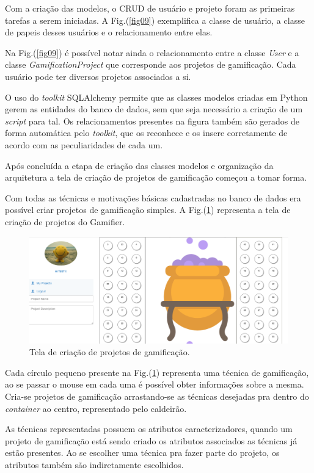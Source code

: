Com a criação das modelos, o CRUD de usuário e projeto foram as primeiras tarefas a serem iniciadas. A Fig.(\ref{fig09}) exemplifica a classe de usuário, a classe de papeis desses usuários e o relacionamento entre elas. 

Na Fig.(\ref{fig09}) é possível notar ainda o relacionamento entre a classe \textit{User} e a classe \textit{GamificationProject} que corresponde aos projetos de gamificação. Cada usuário pode ter diversos projetos associados a si.


O uso do \textit{toolkit} SQLAlchemy  permite que as classes modelos criadas em Python gerem as entidades do banco de dados, sem que seja necessário a criação de um \textit{script} para tal. Os relacionamentos presentes na figura também são gerados de forma automática pelo \textit{toolkit}, que os reconhece e os insere corretamente de acordo com as peculiaridades de cada um.

Após concluída a etapa de criação das classes modelos e organização da arquitetura a tela de criação de projetos de gamificação começou a tomar forma. 


Com todas as técnicas e motivações básicas cadastradas no banco de dados era possível criar projetos de gamificação simples. A Fig.(\ref{fig10}) representa a tela de criação de projetos do Gamifier.


\begin{figure}[h]
	\centering
		\includegraphics[keepaspectratio=true,scale=0.4]{figuras/telainicial.png}
	\caption{Tela de criação de projetos de gamificação.\label{fig10}}
\end{figure}


Cada círculo pequeno presente na Fig.(\ref{fig10}) representa uma técnica de gamificação, ao se passar o mouse em cada uma é possível obter informações sobre a mesma. Cria-se projetos de gamificação arrastando-se as técnicas desejadas pra dentro do \textit{container} ao centro, representado pelo caldeirão.

As técnicas representadas possuem os atributos caracterizadores, quando um projeto de gamificação está sendo criado os atributos associados as técnicas já estão presentes. Ao se escolher uma técnica pra fazer parte do projeto, os atributos também são indiretamente escolhidos.

